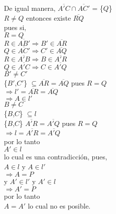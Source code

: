 \documentclass[12pt]{book}
\theoremstyle{definition}
\begin{document}
    De igual manera,
    $\overline{A'C} \cap \overline{AC'}$ = \{$Q$\}\\
    $R \neq Q$ entonces existe $\overline{RQ}$\\

    pues si,\\
    $R=Q$\\
    $R \in \overline{AB'} \Rightarrow B' \in \overline{AR}$\\
    $Q \in \overline{AC'} \Rightarrow C' \in \overline{AQ}$\\
    $R \in \overline{A'B} \Rightarrow B \in \overline{A'R}$\\
    $Q \in \overline{A'C} \Rightarrow C \in \overline{A'Q}$\\

    $B' \neq C'$\\
    \{$B'$,$C'$\} $\subseteq \overline{AR} = \overline{AQ}$ pues $R=Q$\\
    $\Rightarrow l' = \overline{AR} = \overline{AQ}$\\
    $\Rightarrow A \in l'$\\

    $B \neq C$\\
    \{$B$,$C$\} $\subseteq l$\\
    \{$B$,$C$\} $\overline{A'R} = \overline{A'Q}$ pues $R=Q$\\
    $\Rightarrow l = \overline{A'R} = \overline{A'Q}$\\
      por lo tanto\\
      $A' \in l$\\
    lo cual es una contradicción, pues,\\
    $A \in l$ y $A \in l'$\\
    $\Rightarrow A = P$\\
    y $A' \in l'$ y $A' \in l$\\
    $\Rightarrow A' = P$\\
    por lo tanto\\
    $A = A'$ lo cual no es posible.
    

  

\printindex  
\end{document}
